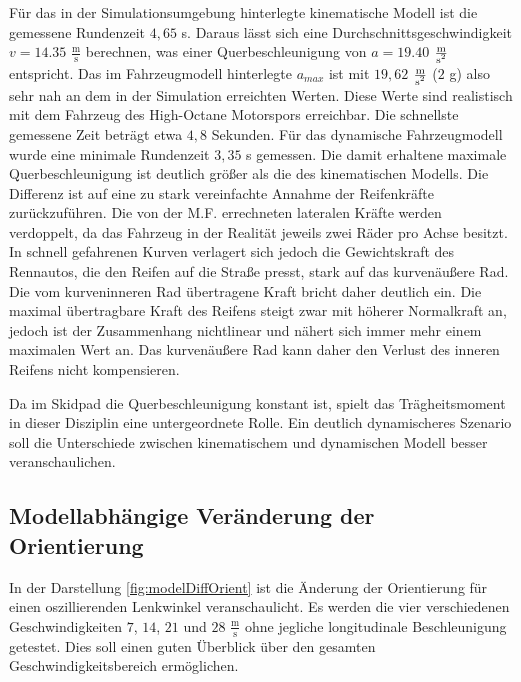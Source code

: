 \documentclass{like}
\begin{document}
Für das in der Simulationsumgebung hinterlegte kinematische Modell ist die gemessene Rundenzeit $4,65$ s. Daraus lässt sich eine Durchschnittsgeschwindigkeit $ v= 14.35$ $ \frac{\text{m}}{\text{s}}$ berechnen, was einer Querbeschleunigung von $a = 19.40$ $ \frac{\text{m}}{\text{s\textsuperscript{2}}}$ entspricht. Das im Fahr\-zeug\-mo\-dell hinterlegte $a_{max}$ ist mit $19,62$ $ \frac{\text{m}}{\text{s\textsuperscript{2}}}$ ($2$ g) also sehr nah an dem in der Simulation erreichten Werten. Diese Werte sind realistisch mit dem Fahrzeug des High-Octane Motorspors erreichbar. Die schnellste gemessene Zeit beträgt etwa $4,8$ Sekunden. 
Für das dynamische Fahrzeugmodell wurde eine minimale Rundenzeit $3,35$ s gemessen.  Die damit erhaltene maximale Querbeschleunigung ist deutlich größer als die des kinematischen Modells. Die Differenz ist auf eine zu stark vereinfachte Annahme der Reifenkräfte zurückzuführen. Die von der \ac{M.F.} errechneten lateralen Kräfte werden verdoppelt, da das Fahrzeug in der Realität jeweils zwei Räder pro Achse besitzt. In schnell gefahrenen Kurven verlagert sich jedoch die Gewichtskraft des Rennautos, die den Reifen auf die Straße presst, stark auf das kurvenäußere Rad. Die vom kurveninneren Rad übertragene Kraft bricht daher deutlich ein.
Die maximal übertragbare Kraft des Reifens steigt zwar mit höherer Normalkraft an, jedoch ist der Zusammenhang nichtlinear und nähert sich immer mehr einem maximalen Wert an. Das kurvenäußere Rad kann daher den Verlust des inneren Reifens nicht kompensieren. 

Da im Skidpad die Querbeschleunigung konstant ist, spielt das Trägheitsmoment in dieser Disziplin eine untergeordnete Rolle.
Ein deutlich dynamischeres Szenario soll die Unterschiede zwischen kinematischem und dynamischen Modell besser veranschaulichen.

\subsection{Modellabhängige Veränderung der Orientierung}
In der Darstellung \ref{fig:modelDiffOrient} ist die Änderung der Orientierung für einen oszillierenden Lenkwinkel veranschaulicht. Es werden die vier verschiedenen Geschwindigkeiten $7$, $14$, $21$ und $28$ $\frac{\text{m}}{\text{s}}$ ohne jegliche longitudinale Beschleunigung getestet. Dies soll einen guten Überblick über den gesamten Geschwindigkeitsbereich ermöglichen.
\end{document}
